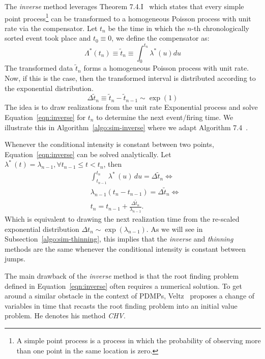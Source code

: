 \documentclass{juliacon}
\numberwithin{equation}{section}
\begin{document}
The \textit{inverse} method leverages Theorem 7.4.I~\cite{daley2003} which states that every simple point process\footnote{A simple point process is a process in which the probability of observing more than one point in the same location is zero.} can be transformed to a homogeneous Poisson process with unit rate via the compensator. Let \( t_n \) be the time in which the \( n \)-th chronologically sorted event took place and \( t_0 \equiv 0 \), we define the compensator as:
\begin{equation} \label{eqn:compensator}
  \Lambda^\ast (t_n) \equiv \tilde{t}_n \equiv \int_0^{t_n} \lambda^\ast (u) du
\end{equation}
The transformed data \( \tilde{t}_n \) forms a homogeneous Poisson process with unit rate. Now, if this is the case, then the transformed interval is distributed according to the exponential distribution.
\begin{equation}\label{eqn:inverse}
  \Delta \tilde{t}_n \equiv \tilde{t}_n - \tilde{t}_{n-1} \sim \exp(1)
\end{equation}
The idea is to draw realizations from the unit rate Exponential process and solve Equation~\ref{eqn:inverse} for \( t_n \)  to determine the next event/firing time. We illustrate this in Algorithm~\ref{algo:sim-inverse} where we adapt Algorithm 7.4~\cite{daley2003}.

Whenever the conditional intensity is constant between two points, Equation~\ref{eqn:inverse} can be solved analytically. Let \( \lambda^\ast \, (t) = \lambda_{n-1} , \forall t_{n-1} \leq t < t_n \), then
\begin{equation}
\begin{split}
  &\int_{t_{n-1}}^{t_n} \lambda^\ast \, (u) \, du = \Delta \tilde{t}_{n} \iff \\
  &\lambda_{n-1} (t_n - t_{n-1}) = \Delta \tilde{t}_n \iff \\
  &t_n = t_{n-1} + \frac{\Delta \tilde{t}_n}{\lambda_{n-1}}.
\end{split}
\end{equation}
Which is equivalent to drawing the next realization time from the re-scaled exponential distribution \( \Delta t_n \sim \exp(\lambda_{n-1}) \). As we will see in Subsection~\ref{algo:sim-thinning}, this implies that the \textit{inverse} and \textit{thinning} methods are the same whenever the conditional intensity is constant between jumps.

The main drawback of the \textit{inverse} method is that the root finding problem defined in Equation~\ref{eqn:inverse} often requires a numerical solution. To get around a similar obstacle in the context of PDMPs, Veltz~\cite{veltz2015} proposes a change of variables in time that recasts the root finding problem into an initial value problem. He denotes his method \textit{CHV}.
\end{document}

